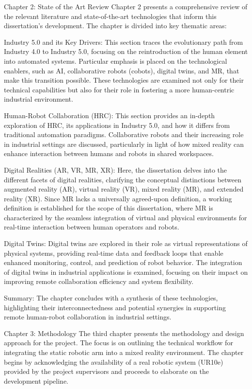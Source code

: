 Chapter 2: State of the Art Review
Chapter 2 presents a comprehensive review of the relevant literature and state-of-the-art technologies that inform this dissertation's development. The chapter is divided into key thematic areas:

Industry 5.0 and its Key Drivers: This section traces the evolutionary path from Industry 4.0 to Industry 5.0, focusing on the reintroduction of the human element into automated systems. Particular emphasis is placed on the technological enablers, such as AI, collaborative robots (cobots), digital twins, and MR, that make this transition possible. These technologies are examined not only for their technical capabilities but also for their role in fostering a more human-centric industrial environment.

Human-Robot Collaboration (HRC): This section provides an in-depth exploration of HRC, its applications in Industry 5.0, and how it differs from traditional automation paradigms. Collaborative robots and their increasing role in industrial settings are discussed, particularly in light of how mixed reality can enhance interaction between humans and robots in shared workspaces.

Digital Realities (AR, VR, MR, XR): Here, the dissertation delves into the different facets of digital realities, clarifying the conceptual distinctions between augmented reality (AR), virtual reality (VR), mixed reality (MR), and extended reality (XR). Since MR lacks a universally agreed-upon definition, a working definition is established for the scope of this dissertation, where MR is characterized by the seamless integration of virtual and physical environments for real-time interaction between human operators and robots.

Digital Twins: Digital twins are explored in their role as virtual representations of physical systems, providing real-time data and feedback loops that enable enhanced monitoring, control, and prediction of robot behavior. The integration of digital twins in industrial applications is examined, focusing on their impact on improving remote collaboration efficiency and system flexibility.

Summary: The chapter concludes with a synthesis of these technologies, highlighting their interconnectedness and potential synergies in supporting remote human-robot collaboration in industrial settings.

Chapter 3: Methodology
The third chapter presents the methodology and design approach for the project. The focus is on outlining the technical workflow for integrating the static robotic arm into a mixed reality environment. The chapter begins by acknowledging the availability of a real robotic system (UR10e) provided by the project supervisors and proceeds to elaborate on the development pipeline.

